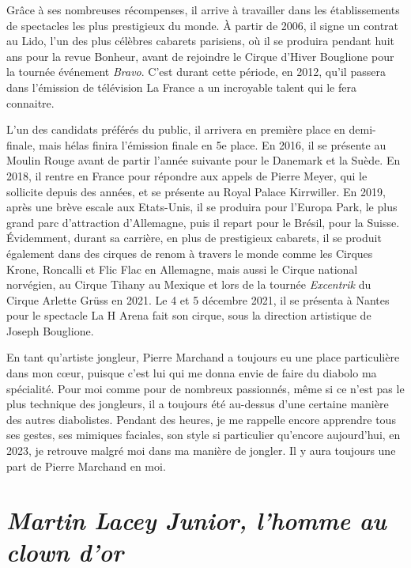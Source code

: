 Grâce à ses nombreuses récompenses, il arrive à travailler dans les établissements de spectacles les plus prestigieux du monde. À partir de 2006, il signe un contrat au Lido, l'un des plus célèbres cabarets parisiens, où il se produira pendant huit ans pour la revue Bonheur, avant de rejoindre le Cirque d'Hiver Bouglione pour la tournée événement \textit{Bravo}. C'est durant cette période, en 2012, qu'il passera dans l'émission de télévision La France a un incroyable talent qui le fera connaitre.

L'un des candidats préférés du public, il arrivera en première place en demi-finale, mais hélas finira l'émission finale en 5e place. En 2016, il se présente au Moulin Rouge avant de partir l'année suivante pour le Danemark et la Suède. En 2018, il rentre en France pour répondre aux appels de Pierre Meyer, qui le sollicite depuis des années, et se présente au Royal Palace Kirrwiller. En 2019, après une brève escale aux Etats-Unis, il se produira pour l'Europa Park, le plus grand parc d'attraction d'Allemagne, puis il repart pour le Brésil, pour la Suisse. Évidemment, durant sa carrière, en plus de prestigieux cabarets, il se produit également dans des cirques de renom à travers le monde comme les Cirques Krone, Roncalli et Flic Flac en Allemagne, mais aussi le Cirque national norvégien, au Cirque Tihany au Mexique et lors de la tournée \textit{Excentrik} du Cirque Arlette Grüss en 2021. Le 4 et 5 décembre 2021, il se présenta à Nantes pour le spectacle La H Arena fait son cirque, sous la direction artistique de Joseph Bouglione.

En tant qu'artiste jongleur, Pierre Marchand a toujours eu une place particulière dans mon cœur, puisque c'est lui qui me donna envie de faire du diabolo ma spécialité. Pour moi comme pour de nombreux passionnés, même si ce n’est pas le plus technique des jongleurs, il a toujours été au-dessus d'une certaine manière des autres diabolistes. Pendant des heures, je me rappelle encore apprendre tous ses gestes, ses mimiques faciales, son style si particulier qu'encore aujourd'hui, en 2023, je retrouve malgré moi dans ma manière de jongler. Il y aura toujours une part de Pierre Marchand en moi.

\section*{\textit{Martin Lacey Junior, l'homme au clown d'or}}

